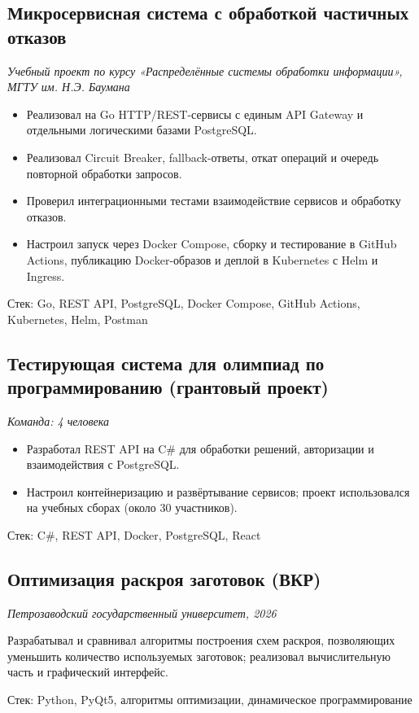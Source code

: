 \documentclass[10pt,a4paper]{article}
\newcommand{\jobmeta}[1]{{\small\color{midgray}\textit{#1}}\par\vspace{0.05em}}
\newcommand{\stackline}[1]{\par{\small\color{midgray}Стек: #1}\par}
\newcommand{\repoline}[1]{\par{\small\color{midgray}Репозиторий: #1}\par}
\begin{document}
\subsection*{Микросервисная система с обработкой частичных отказов}
\jobmeta{Учебный проект по курсу «Распределённые системы обработки информации», МГТУ им. Н.Э. Баумана}
\begin{itemize}
  \item Реализовал на Go HTTP/REST-сервисы с единым API Gateway и отдельными логическими базами PostgreSQL.
  \item Реализовал Circuit Breaker, fallback-ответы, откат операций и очередь повторной обработки запросов.
  \item Проверил интеграционными тестами взаимодействие сервисов и обработку отказов.
  \item Настроил запуск через Docker Compose, сборку и тестирование в GitHub Actions, публикацию Docker-образов и деплой в Kubernetes с Helm и Ingress.
\end{itemize}
\stackline{Go, REST API, PostgreSQL, Docker Compose, GitHub Actions, Kubernetes, Helm, Postman}

\subsection*{Тестирующая система для олимпиад по программированию (грантовый проект)}
\jobmeta{Команда: 4 человека}
\begin{itemize}
  \item Разработал REST API на C\# для обработки решений, авторизации и взаимодействия с PostgreSQL.
  \item Настроил контейнеризацию и развёртывание сервисов; проект использовался на учебных сборах (около 30 участников).
\end{itemize}
\stackline{C\#, REST API, Docker, PostgreSQL, React}

\subsection*{Оптимизация раскроя заготовок (ВКР)}
\jobmeta{Петрозаводский государственный университет, 2026}
Разрабатывал и сравнивал алгоритмы построения схем раскроя, позволяющих уменьшить количество используемых заготовок; реализовал вычислительную часть и графический интерфейс.
\stackline{Python, PyQt5, алгоритмы оптимизации, динамическое программирование}
\end{document}
